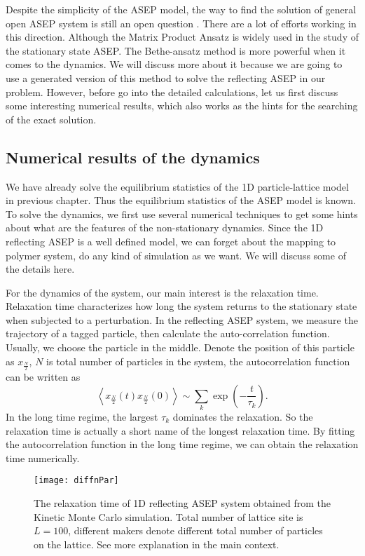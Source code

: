 Despite the simplicity of the ASEP model, the way to find the solution of general open ASEP system is still an open question \cite{Crampe2014b, Mallick2011b}. There are a lot of efforts working in this direction. Although the Matrix Product Ansatz is widely used in the study of the stationary state ASEP. The Bethe-ansatz method is more powerful when it comes to the dynamics. We will discuss more about it because we are going to use a generated version of this method to solve the reflecting ASEP in our problem. However, before go into the detailed calculations, let us first discuss some interesting numerical results, which also works as the hints for the searching of the exact solution.

\subsection{Numerical results of the dynamics}
\label{sub:numerical_results_of_the_dynamics}

We have already solve the equilibrium statistics of the 1D particle-lattice model in previous chapter. Thus the equilibrium statistics of the ASEP model is known. To solve the dynamics, we first use several numerical techniques to get some hints about what are the features of the non-stationary dynamics. Since the 1D reflecting ASEP is a well defined model, we can forget about the mapping to polymer system, do any kind of simulation as we want. We will discuss some of the details here. 

For the dynamics of the system, our main interest is the relaxation time. Relaxation time characterizes how long the system returns to the stationary state when subjected to a perturbation. In the reflecting ASEP system, we measure the trajectory of a tagged particle, then calculate the auto-correlation function. Usually, we choose the particle in the middle. Denote the position of this particle as $x_{\frac{N}{2}}$, $N$ is total number of particles in the system, the autocorrelation function can be written as 
\begin{equation}
    \label{eq:autocorrelation}
    \left< x_{\frac{N}{2}}(t) x_{\frac{N}{2}}(0) \right> 
    \sim \sum_{k}\exp\left(-\frac{t}{\tau_k}\right).
\end{equation}
In the long time regime, the largest $\tau_k$ dominates the relaxation. So the relaxation time is actually a short name of the longest relaxation time. By fitting the autocorrelation function in the long time regime, we can obtain the relaxation time numerically. 
\begin{figure}[htpb]
    \centering
    \texttt{[image: diffnPar]}
    \caption{The relaxation time of 1D reflecting ASEP system obtained from the Kinetic Monte Carlo simulation. Total number of lattice site is $L=100$, different makers denote different total number of particles on the lattice. See more explanation in the main context.}
    \label{fig:diffnPar}
\end{figure}

